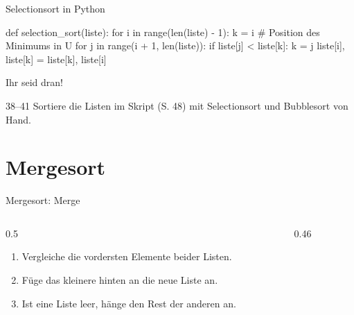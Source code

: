 \expandafter\documentclass\expandafter[\designopts]{beamer}
\begin{document}
\begin{frame}[fragile]{Selectionsort in Python}
  \begin{code}
def selection_sort(liste):
    for i in range(len(liste) - 1):
        k = i  # Position des Minimums in U
        for j in range(i + 1, len(liste)):
            if liste[j] < liste[k]:
                k = j
        liste[i], liste[k] = liste[k], liste[i]
  \end{code}
\end{frame}

\begin{frame}[doit={zu zweit · 15 Min}]{Ihr seid dran!}
  \vfill
  \begin{task}{38–41}
    \large Sortiere die Listen im Skript (S. 48) mit Selectionsort und Bubblesort von Hand.
  \end{task}
  \vfill
\end{frame}

\section{Mergesort}
\begin{frame}{Mergesort: Merge}
  \begin{columns}[T,onlytextwidth]
    \begin{column}{0.5\textwidth}
      \begin{enumerate}
        \item Vergleiche die vordersten Elemente beider Listen.
        \item \alert{Füge das kleinere hinten an die neue Liste an.}
        \item Ist eine Liste leer, hänge den Rest der anderen an.
      \end{enumerate}
    \end{column}
    \begin{column}{0.46\textwidth}
      \vspace{4mm}
    \end{column}
  \end{columns}
\end{frame}
\end{document}
